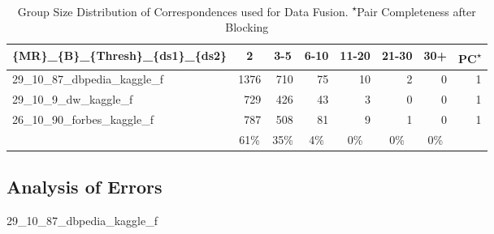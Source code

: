 \documentclass[11pt,titlepage,oneside,openany]{article}
\begin{document}
\begin{table}[]
	\centering
	\small
	\begin{tabular}{lrrrrrrr}
		\textbf{\{MR\}\_\{B\}\_\{Thresh\}\_\{ds1\}\_\{ds2\}} & \multicolumn{1}{c}{\textbf{2}} & \multicolumn{1}{c}{\textbf{3-5}} & \multicolumn{1}{c}{\textbf{6-10}} & \multicolumn{1}{c}{\textbf{11-20}} & \multicolumn{1}{c}{\textbf{21-30}} & \multicolumn{1}{c}{\textbf{30+}} & \multicolumn{1}{c}{\textbf{PC\textsuperscript{$\star$}}} \\\hline
		29\_10\_87\_dbpedia\_kaggle\_f              & 1376                           & 710                              & 75                                & 10                                 & 2                                  & 0                                & 1                               \\
		29\_10\_9\_dw\_kaggle\_f                    & 729                            & 426                              & 43                                & 3                                  & 0                                  & 0                                & 1                               \\
		26\_10\_90\_forbes\_kaggle\_f               & 787                            & 508                              & 81                                & 9                                  & 1                                  & 0                                & 1                               \\\hline
		\multicolumn{1}{c}{}                        & \multicolumn{1}{c}{61\%}       & \multicolumn{1}{c}{35\%}         & \multicolumn{1}{c}{4\%}           & \multicolumn{1}{c}{0\%}            & \multicolumn{1}{c}{0\%}            & \multicolumn{1}{c}{0\%}          & \multicolumn{1}{c}{}           
	\end{tabular}
\caption[Group Size Distribution of Correspondences used for Data Fusion]{Group Size Distribution of Correspondences used for Data Fusion. \small\textsuperscript{$\star$}Pair Completeness after Blocking}
\label{tab:group-size-dist}
\end{table}


\subsection{Analysis of Errors}
\label{sec:errors}
29\_10\_87\_dbpedia\_kaggle\_f

\end{document}
